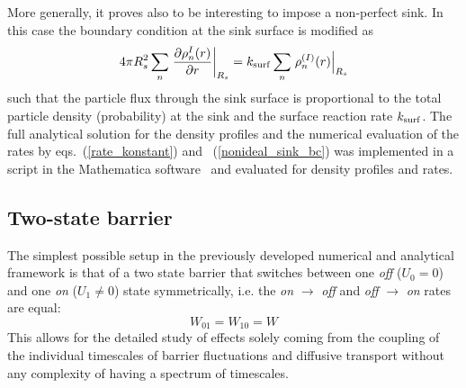 \documentclass[preprint,superscriptaddress]{revtex4-1}
\begin{document}
More generally, it proves also to be interesting to impose a non-perfect sink. In this case the boundary condition at the sink surface is modified as
\begin{equation}
    4 \pi R_s^2 \sum_n \left. \frac{\partial \rho_n^{I}(r)}{\partial r} \right|_{R_s} = k_{\rm surf} \sum_n \left. \rho_n^{(I)}(r) \right|_{R_s}
    \label{nonideal_sink_bc}
\end{equation}
such that the particle flux through the sink surface is proportional to the total particle density (probability) at the sink and
the surface reaction rate $k_{\rm surf}$. 
The full analytical solution for the density profiles and the numerical evaluation of the rates by eqs.~(\ref{rate_konstant}) and ~(\ref{nonideal_sink_bc}) 
was implemented in a script in the Mathematica software~\cite{mathematica} and evaluated for density profiles and rates.

\subsection{Two-state barrier}

The simplest possible setup in the previously developed numerical and analytical framework is that of a two state barrier that switches between one \emph{off} ($U_0 = 0$) and one \emph{on} ($U_1 \ne 0$) state symmetrically, i.e. the \emph{on} $\rightarrow$ \emph{off} and \emph{off} $\rightarrow$ \emph{on} rates are equal:
\begin{equation}
    W_{01}=W_{10}=W
    \label{symmetric_rates}
\end{equation}
This allows for the detailed study of effects solely coming from the coupling of the individual timescales of barrier fluctuations and diffusive transport without any complexity of having a spectrum of timescales. 
\end{document}
